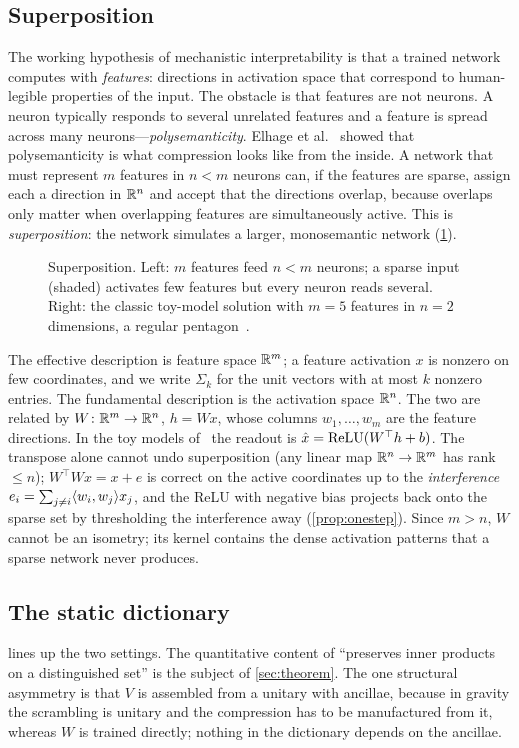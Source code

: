 \subsection{Superposition}\label{sec:superposition}
The working hypothesis of mechanistic interpretability is that a trained network computes with \emph{features}:
directions in activation space that correspond to human-legible properties of the input. The obstacle is that
features are not neurons. A neuron typically responds to several unrelated features and a feature is spread across
many neurons---\emph{polysemanticity}. Elhage et al.~\cite{TMS} showed that polysemanticity is what compression
looks like from the inside. A network that must represent $m$ features in $n<m$ neurons can, if the features are
sparse, assign each a direction in $\mathbb R^n$ and accept that the directions overlap, because overlaps only matter
when overlapping features are simultaneously active. This is \emph{superposition}: the network simulates a larger,
monosemantic network (\cref{fig:tms}).

\begin{figure}[t]
\centering\TMSPicture
\caption{Superposition. Left: $m$ features feed $n<m$ neurons; a sparse input (shaded) activates few features but
every neuron reads several. Right: the classic toy-model solution with $m=5$ features in $n=2$ dimensions, a
regular pentagon~\cite{TMS}.}
\label{fig:tms}
\end{figure}

The effective description is feature space $\mathbb R^m$; a feature activation $x$ is nonzero on few coordinates, and we
write $\Sigma_k$ for the unit vectors with at most $k$ nonzero entries. The fundamental description is the
activation space $\mathbb R^n$. The two are related by $W\colon\mathbb R^m\to\mathbb R^n$, $h=Wx$, whose columns $w_1,\dots,w_m$ are the
feature directions. In the toy models of~\cite{TMS} the readout is $\hat x=\operatorname{ReLU}(W^\top h+b)$. The transpose alone
cannot undo superposition (any linear map $\mathbb R^n\to\mathbb R^m$ has rank $\le n$); $W^\top Wx=x+e$ is correct on the active
coordinates up to the \emph{interference} $e_i=\sum_{j\ne i}\langle w_i,w_j\rangle x_j$, and the ReLU with negative bias
projects back onto the sparse set by thresholding the interference away (\cref{prop:onestep}). Since $m>n$, $W$
cannot be an isometry; its kernel contains the dense activation patterns that a sparse network never produces.

\subsection{The static dictionary}
 lines up the two settings. The quantitative content of ``preserves inner products on a
distinguished set'' is the subject of \cref{sec:theorem}. The one structural asymmetry is that $V$ is assembled
from a unitary with ancillae, because in gravity the scrambling is unitary and the compression has to be
manufactured from it, whereas $W$ is trained directly; nothing in the dictionary depends on the ancillae.

